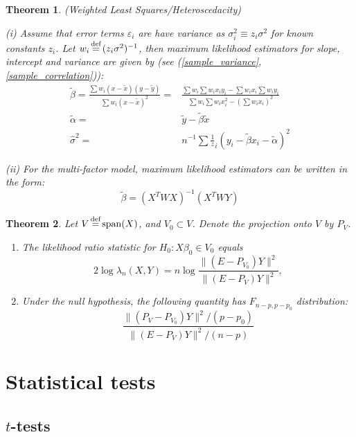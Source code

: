\documentclass[12pt]{article}
\newtheorem{theorem}{Theorem}[section]
\theoremstyle{definition}
\theoremstyle{remark}
\numberwithin{equation}{section}
\newcommand{\eq}{\stackrel{\mathclap{\normalfont\text{def}}}{=}}
\begin{document}
\begin{theorem}\emph{(Weighted Least Squares/Heteroscedacity)}

	\noindent(i) Assume that error terms $\varepsilon_i$ are have variance as $\sigma_i^2 \equiv z_i\sigma^2$ for known constants $z_i$. Let $w_i \eq (z_i\sigma^2)^{-1}$, then maximum likelihood estimators for slope, intercept and variance are given by (see (\ref{sample_variance}, \ref{sample_correlation})):
	\begin{align*}
		\tilde{\beta} = \frac{\sum w_i(x - \tilde x)(y - \tilde y)}{\sum w_i (x - \tilde x)^2} =& \frac{\sum w_i\sum w_i x_i y_i - \sum w_ix_i\sum w_i y_i}{\sum w_i\sum w_i x_i^2 - \left(\sum w_ix_i\right)^2}\\
		\tilde\alpha =& \tilde y - \tilde \beta\tilde x\\
		\hat\sigma^2 =& n^{-1}\sum\frac 1 z_i(y_i - \tilde \beta x_i - \tilde \alpha)^2
	\end{align*}

	\noindent(ii) For the multi-factor model, maximum likelihood estimators can be written in the form:
	\begin{equation*}
		\tilde \beta = (X^TWX)^{-1}(X^T WY)
	\end{equation*}
\end{theorem}




\begin{theorem}
	Let $V\eq \operatorname{span}(X)$, and $V_0\subset V$. Denote the projection onto $V$ by $P_V$.
	\begin{enumerate}
		\item The likelihood ratio statistic for $H_0:X \beta_0 \in V_0$ equals
	\begin{equation*}
		2\log\lambda_n(X, Y) = n\log\frac{\|(E - P_{V_0})Y\|^2}{\|(E - P_{V})Y\|^2},
	\end{equation*}
	\item Under the null hypothesis, the following quantity has $F_{n-p, p-p_0}$ distribution:
	\begin{equation*}
		\frac{\|(P_V - P_{V_0})Y\|^2/(p-p_0)}{\|(E - P_{V})Y\|^2/(n-p)}
	\end{equation*}
\end{enumerate}
\end{theorem}


\section{Statistical tests}
\subsection{$t$-tests}
\end{document}
